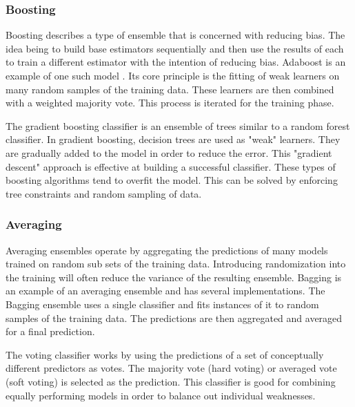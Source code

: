 \subsubsection{Boosting}
Boosting describes a type of ensemble that is concerned with reducing bias.
The idea being to build base estimators sequentially and then use the results of each to train a different estimator with the intention of reducing bias.
Adaboost is an example of one such model \cite{freund1995desicion}.
Its core principle is the fitting of weak learners on many random samples of the training data.
These learners are then combined with a weighted majority vote. 
This process is iterated for the training phase.



\par
The gradient boosting classifier is an ensemble of trees similar to a random forest classifier.
In gradient boosting, decision trees are used as "weak" learners.
They are gradually added to the model in order to reduce the error.
This "gradient descent" approach is effective at building a successful classifier.
These types of boosting algorithms tend to overfit the model.
This can be solved by enforcing tree constraints and random sampling of data.


\subsubsection{Averaging}
Averaging ensembles operate by aggregating the predictions of many models trained on random sub sets of the training data.
Introducing randomization into the training will often reduce the variance of the resulting ensemble.
Bagging is an example of an averaging ensemble and has several implementations.
The Bagging ensemble uses a single classifier and fits instances of it to random samples of the training data.
The predictions are then aggregated and averaged for a final prediction.

The voting classifier works by using the predictions of a set of conceptually different predictors as votes.
The majority vote (hard voting) or averaged vote (soft voting) is selected as the prediction.
This classifier is good for combining equally performing models in order to balance out individual weaknesses.

